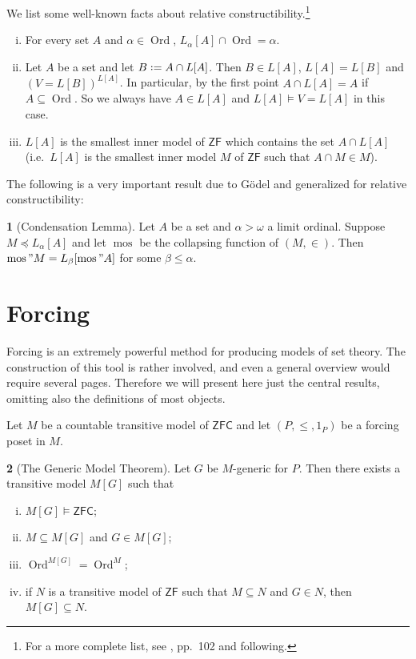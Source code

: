 \documentclass[11pt,a4paper]{report}
\theoremstyle{definition}
\theoremstyle{num.custom-title}
\theoremstyle{custom-title}
\newtheorem*{teo_custom-title_nonum}{}
\DeclareMathOperator{\Ord}{\text{Ord}}
\DeclareMathOperator{\sse}{\subseteq}
\DeclareMathOperator{\mos}{mos}
\newcommand{\ZF}{\ensuremath{\mathsf{ZF}}\xspace}
\newcommand{\ZFC}{\ensuremath{\mathsf{ZFC}}\xspace}
\newcommand*{\defeq}{\mathrel{\rlap{%
                     \raisebox{0.3ex}{$\cdot$}}%
                     \raisebox{-0.3ex}{$\cdot$}}%
                     =}
\begin{document}
We list some well-known facts about relative constructibility.\footnote{For a more complete list, see \cite{Dev1984}, pp.\ 102 and following.}
\begin{enumerate}[i)]
\item For every set $A$ and $\alpha \in \Ord$, $L_\alpha [A] \cap \Ord = \alpha$.
\item Let $A$ be a set and let $B \defeq A \cap L[A]$. Then $B \in L[A]$, $L[A] = L[B]$ and $(V=L[B])^{L[A]}$. In particular, by the first point $A \cap L[A] = A$ if $A \sse \Ord$. So we always have $A \in L[A]$ and $L[A] \models V = L[A]$ in this case.
\item $L[A]$ is the smallest inner model of \ZF which contains the set $A \cap L[A]$ (i.e.\ $L[A]$ is the smallest inner model $M$ of \ZF such that $A \cap M \in M$).
\end{enumerate}

The following is a very important result due to Gödel and generalized for relative constructibility:

\begin{teo_custom-title_nonum}[Condensation Lemma]
Let $A$ be a set and $\alpha > \omega$ a limit ordinal. Suppose $M \preceq L_\alpha[A]$ and let $\mos$ be the collapsing function of $(M,\in)$. Then $\mos" M = L_\beta [\mos" A]$ for some $\beta \leq \alpha$.
\end{teo_custom-title_nonum}


\section*{Forcing}

Forcing is an extremely powerful method for producing models of set theory. The construction of this tool is rather involved, and even a general overview would require several pages. Therefore we will present here just the central results, omitting also the definitions of most objects.

Let $M$ be a countable transitive model of \ZFC and let $(P, \leq, 1_P)$ be a forcing poset in $M$.

\begin{teo_custom-title_nonum}[The Generic Model Theorem]
Let $G$ be $M$-generic for $P$. Then there exists a transitive model $M[G]$ such that
\begin{enumerate}[(i)]
\item $M[G] \models \ZFC$;
\item $M \sse M[G]$ and $G \in M[G]$;
\item $\Ord^{M[G]} = \Ord^M$;
\item if $N$ is a transitive model of \ZF such that $M \sse N$ and $G \in N$, then $M[G] \sse N$.
\end{enumerate}
\end{teo_custom-title_nonum}
\end{document}
